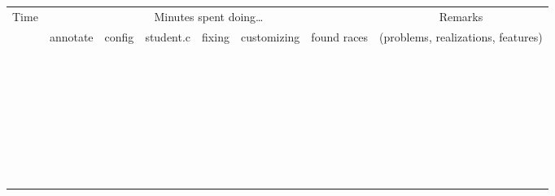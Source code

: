 \documentclass{article}
\begin{document}
\addtolength{\oddsidemargin}{-.5in} 
\newcommand\asdf[1]{\hspace{-0.05in}\small{#1}\hspace{-0.05in}}
\begin{center}
\begin{tabular}{|c||c|c|c|c|c|c||c|}
	\hline
	\multirow{2}{*}{Time} & \multicolumn{6}{|c||}{Minutes spent doing\dots} & Remarks \\
	\cline{2-7}
	& \asdf{annotate} & \asdf{config} & \asdf{student.c} & \asdf{fixing} & \asdf{customizing} & \asdf{found races} & \hspace{0.7in} (problems, realizations, features) \hspace{0.7in} \\
	\hline \hline
	& & & & & & & \\
	& & & & & & & \\
	& & & & & & & \\
	\hline
	& & & & & & & \\
	& & & & & & & \\
	& & & & & & & \\
	\hline
	& & & & & & & \\
	& & & & & & & \\
	& & & & & & & \\
	\hline
	& & & & & & & \\
	& & & & & & & \\
	& & & & & & & \\
	\hline
	& & & & & & & \\
	& & & & & & & \\
	& & & & & & & \\
	\hline
	& & & & & & & \\
	& & & & & & & \\
	& & & & & & & \\
	\hline
	& & & & & & & \\
	& & & & & & & \\
	& & & & & & & \\
	\hline
	& & & & & & & \\
	& & & & & & & \\
	& & & & & & & \\
	\hline
	& & & & & & & \\
	& & & & & & & \\
	& & & & & & & \\
	\hline
	& & & & & & & \\
	& & & & & & & \\
	& & & & & & & \\
	\hline
	& & & & & & & \\
	& & & & & & & \\
	& & & & & & & \\
	\hline
\end{tabular}
\end{center}
\end{document}
